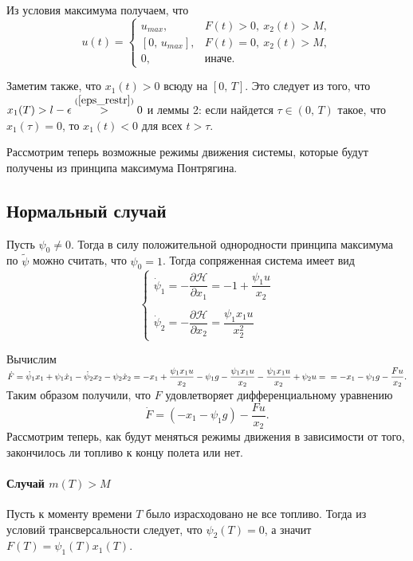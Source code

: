 \documentclass[16pt]{article}
\begin{document}
 
Из условия максимума получаем, что 
 \begin{equation} \label{oc_1}
 u(t) = 
 \begin{cases}
 u_{max}, & F(t) > 0,\  x_2(t) > M, \\
 [0,\, u_{max}], & F(t) = 0, \ x_2(t) > M, \\
 0, &\text{иначе.}
 \end{cases}
 \end{equation}

Заметим также, что $x_1(t) > 0$ всюду на $[0,\,T]$. Это следует из того, что $x_1(T) > l - \epsilon 
\overset{(\ref{eps_restr})}{>} 0$ и леммы 2: если найдется $\tau \in (0,\,T)$ такое, что $x_1(\tau) = 0$, 
то $x_1(t) < 0$ для всех $t > \tau$.

Рассмотрим теперь возможные режимы движения системы, которые будут получены из принципа максимума Понтрягина.
\subsection{Нормальный случай}
Пусть $\psi_0 \not = 0$. Тогда в силу положительной однородности принципа максимума по $\tilde{\psi}$ можно считать,
что $\psi_0 = 1$. Тогда сопряженная система имеет вид 
\begin{equation}
\begin{cases} \label{1_conj_sys1}
\dot{\psi}_1 = -\dfrac{\partial \mathcal{H}}{\partial x_1} = -1 + \dfrac{\psi_1u}{x_2}\\
\\
\dot{\psi}_2 = -\dfrac{\partial \mathcal{H}}{\partial x_2} = \dfrac{\psi_1 x_1 u}{x_2^2}
\end{cases}
\end{equation}

Вычислим $\dot{F} = \dot{\psi}_1x_1 + \psi_1\dot{x}_1 - \dot{\psi}_2x_2 - \psi_2\dot{x}_2 = -x_1 +
\dfrac{\psi_1x_1u}{x_2} - \psi_1 g - \dfrac{\psi_1x_1u}{x_2} - \dfrac{\psi_1x_1u}{x_2} + \psi_2u = \\
=-x_1 - \psi_1g - \dfrac{Fu}{x_2}.$ Таким образом получили, что $F$ удовлетворяет дифференциальному уравнению
\begin{equation} \label{F_ode}
\dot{F} = (-x_1 - \psi_1g) - \dfrac{Fu}{x_2}.
\end{equation}
Рассмотрим теперь, как будут меняться режимы движения в зависимости от того, закончилось ли топливо к концу полета
или нет.
\paragraph{Случай $m(T) > M$}
Пусть к моменту времени $T$ было израсходовано не все топливо. Тогда из условий трансверсальности следует, что
$\psi_2(T) = 0$, а значит $F(T) = \psi_1(T)x_1(T)$. 
\end{document}
